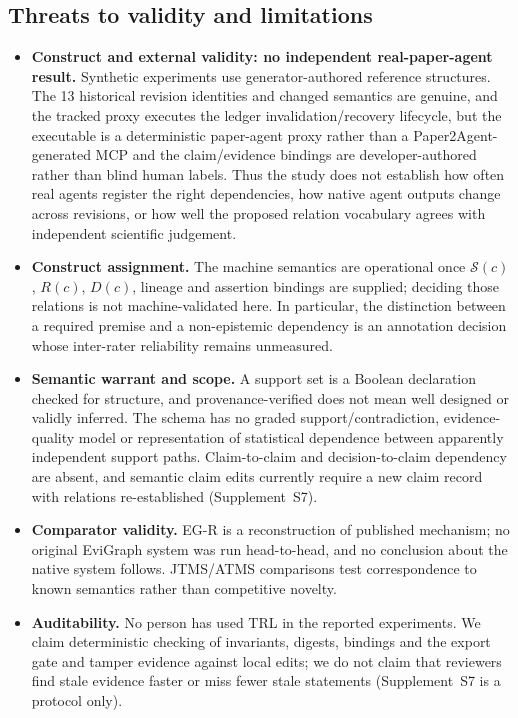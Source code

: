 \documentclass[cmc,article,submit,moreauthors,pdftex]{Definitions/tsp}
\newcommand{\suppl}[1]{Supplement~#1}
\begin{document}
\subsection{Threats to validity and limitations}
\begin{itemize}
    \item \textbf{Construct and external validity: no independent real-paper-agent result.} Synthetic experiments use generator-authored reference structures. The 13 historical revision identities and changed semantics are genuine, and the tracked proxy executes the ledger invalidation/recovery lifecycle, but the executable is a deterministic paper-agent proxy rather than a Paper2Agent-generated MCP and the claim/evidence bindings are developer-authored rather than blind human labels. Thus the study does not establish how often real agents register the right dependencies, how native agent outputs change across revisions, or how well the proposed relation vocabulary agrees with independent scientific judgement.
    \item \textbf{Construct assignment.} The machine semantics are operational once $\mathcal{S}(c)$, $R(c)$, $D(c)$, lineage and assertion bindings are supplied; deciding those relations is not machine-validated here. In particular, the distinction between a required premise and a non-epistemic dependency is an annotation decision whose inter-rater reliability remains unmeasured.
    \item \textbf{Semantic warrant and scope.} A support set is a Boolean declaration checked for structure, and provenance-verified does not mean well designed or validly inferred. The schema has no graded support/contradiction, evidence-quality model or representation of statistical dependence between apparently independent support paths. Claim-to-claim and decision-to-claim dependency are absent, and semantic claim edits currently require a new claim record with relations re-established (\suppl{S7}).
    \item \textbf{Comparator validity.} EG-R is a reconstruction of published mechanism; no original EviGraph system was run head-to-head, and no conclusion about the native system follows. JTMS/ATMS comparisons test correspondence to known semantics rather than competitive novelty.
    \item \textbf{Auditability.} No person has used TRL in the reported experiments. We claim deterministic checking of invariants, digests, bindings and the export gate and tamper evidence against local edits; we do not claim that reviewers find stale evidence faster or miss fewer stale statements (\suppl{S7} is a protocol only).

\end{itemize}
\end{document}
